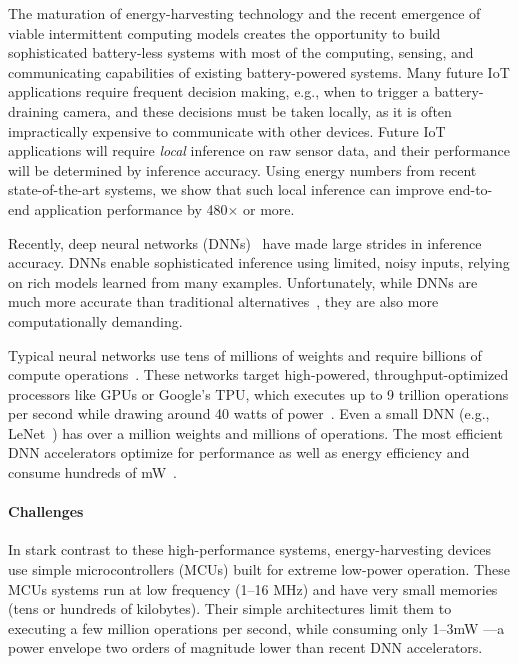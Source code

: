 The maturation of energy-harvesting technology and the recent
emergence of viable intermittent computing models creates the
opportunity to build sophisticated battery-less systems with most of
the computing, sensing, and communicating capabilities of existing
battery-powered systems.
%
Many future IoT applications require frequent decision making, e.g.,
when to trigger a battery-draining camera,
%
and these decisions must be taken locally,
as it is often impractically expensive %
to communicate with other devices.
%
Future IoT applications will require {\em local} inference on raw sensor data,
and their performance will be determined by inference accuracy. Using energy
numbers from recent state-of-the-art systems, we show that such local inference
can improve end-to-end application performance by 480$\times$ or more.

Recently, deep neural networks (DNNs)~\cite{alexnet, vgg, googlenet} have made
large strides in inference accuracy.
%
DNNs enable sophisticated inference using limited, noisy inputs, relying on
rich models learned from many examples.
%
Unfortunately, while DNNs are much more accurate than traditional
alternatives~\cite{gupta2017protonn, Mitchell:1997:ML:541177}, they are also
more computationally demanding.

Typical neural networks use tens of millions of weights and require
billions of compute operations~\cite{vgg,googlenet,alexnet}.
%
These networks target high-powered,
throughput-optimized processors like GPUs or Google's TPU, which
executes up to 9 trillion operations per second while drawing around
40 watts of power~\cite{jouppi:isca17:tpu}.
%
Even a small DNN (e.g., LeNet~\cite{lecun:ieee89:lenet}) has over a million
weights and millions of operations.
%
The most efficient DNN accelerators optimize for performance as
well as energy efficiency and consume hundreds of
mW~\cite{han:isca16:eie,chen:asplos14:diannao,du:isca15:shidiannao,chen:isca16:eyeriss}.

\paragraph{Challenges}
%
In stark contrast to these high-performance systems, energy-harvesting devices
use simple microcontrollers (MCUs) built for extreme low-power operation.
These MCUs systems run at low frequency (1--16 MHz) and have very small
memories (tens or hundreds of kilobytes).
%
Their simple architectures limit them to executing a few 
million operations per second, while consuming only 1--3mW%
---a power envelope two orders of magnitude lower than recent DNN accelerators.

